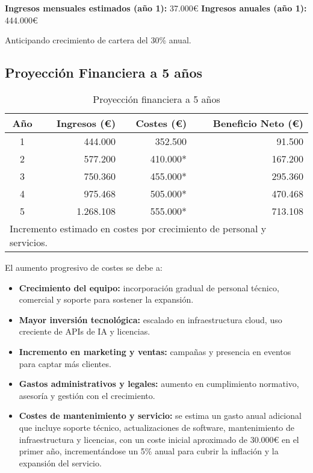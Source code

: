 \textbf{Ingresos mensuales estimados (año 1):} 37.000€  
\textbf{Ingresos anuales (año 1):} 444.000€

Anticipando crecimiento de cartera del 30\% anual.

\subsection{Proyección Financiera a 5 años}

\begin{table}[H]
\centering
\begin{tabular}{|c|r|r|r|}
\hline
\textbf{Año} & \textbf{Ingresos (€)} & \textbf{Costes (€)} & \textbf{Beneficio Neto (€)} \\
\hline
1 & 444.000 & 352.500 & 91.500 \\
2 & 577.200 & 410.000* & 167.200 \\
3 & 750.360 & 455.000* & 295.360 \\
4 & 975.468 & 505.000* & 470.468 \\
5 & 1.268.108 & 555.000* & 713.108 \\
\hline
\multicolumn{4}{l}{\footnotesize *Incremento estimado en costes por crecimiento de personal y servicios.}
\end{tabular}
\caption{Proyección financiera a 5 años}
\end{table}

El aumento progresivo de costes se debe a:

\begin{itemize}
  \item \textbf{Crecimiento del equipo:} incorporación gradual de personal técnico, comercial y soporte para sostener la expansión.
  \item \textbf{Mayor inversión tecnológica:} escalado en infraestructura cloud, uso creciente de APIs de IA y licencias.
  \item \textbf{Incremento en marketing y ventas:} campañas y presencia en eventos para captar más clientes.
  \item \textbf{Gastos administrativos y legales:} aumento en cumplimiento normativo, asesoría y gestión con el crecimiento.
  \item \textbf{Costes de mantenimiento y servicio:} se estima un gasto anual adicional que incluye soporte técnico, actualizaciones de software, mantenimiento de infraestructura y licencias, con un coste inicial aproximado de 30.000€ en el primer año, incrementándose un 5\% anual para cubrir la inflación y la expansión del servicio.
\end{itemize}
